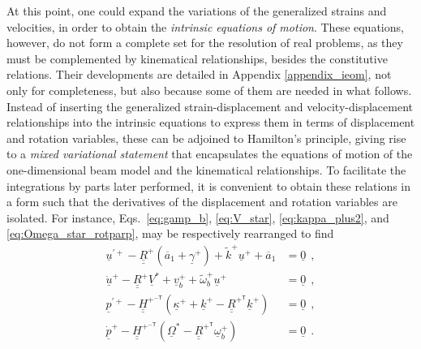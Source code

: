 \documentclass[12pt,a4paper,oneside,english]{abntex2} %
\newcommand{\vect}[1]{\underline{#1}}
\newcommand{\uvec}[1]{\overline{#1}}
\def\tens#1{\underline{\underline{#1}}}
\def\til#1{\widetilde{#1}}
\def\lp{\left(}
\def\rp{\right)}
\def\T{\mathsf{T}}
\def\aone{\uvec{a}_1}
\def\R{\tens{R}}
\def\Rp{\R^+}
\def\RpT{\R^{+^\T}}
\def\u{\vect{u}}
\def\uplus{\u^{+}}
\def\updot{\dot{\u}^{+}}
\def\upprime{\u^{\prime+}}
\def\vb{\vect{v}_b}
\def\vbplus{\vb^{+}}
\def\om{\vect{\omega}_b}
\def\omp{\om^{+}}
\def\omtil{\til{\omega}_b}
\def\omtilp{\omtil^{+}}
\def\gam{\vect{\gamma}}
\def\gamp{\gam^{+}}
\def\kap{\vect{\kappa}}
\def\kapp{\kap^{+}}
\def\k{\vect{k}}
\def\kp{\k^{+}}
\def\ktil{\til{k}}
\def\ktilp{\ktil^{+}}
\def\V{\vect{V}}
\def\Vs{\V^{*}}
\def\Om{\vect{\Omega}}
\def\Oms{\Om^{*}}
\def\H{\tens{H}}
\def\HpmT{\H^{+^{-\T}}}
\def\p{\vect{p}}
\def\pdot{\dot{\p}}
\def\ppdot{\pdot^{+}}
\def\ppprime{\p^{\prime{+}}}
\def\zv{\vect{0}}
\begin{document}
At this point, one could expand the variations of the generalized strains and velocities, in order to obtain the \textit{intrinsic equations of motion}.  These equations, however, do not form a complete set for the resolution of real problems, as they must be complemented by kinematical relationships, besides the constitutive relations. Their developments are detailed in Appendix \ref{appendix_ieom}, not only for completeness, but also because some of them are needed in what follows. Instead of inserting the generalized strain-displacement and velocity-displacement relationships into the intrinsic equations to express them in terms of displacement and rotation variables, these can be adjoined to Hamilton's principle, giving rise to a \textit{mixed variational statement} that encapsulates the equations of motion of the one-dimensional beam model and the kinematical relationships. To facilitate the integrations by parts later performed, it is convenient to obtain these relations in a form such that the derivatives of the displacement and rotation variables are isolated. For instance, Eqs.~\eqref{eq:gamp_b}, \eqref{eq:V_star}, \eqref{eq:kappa_plus2}, and \eqref{eq:Omega_star_rotparp}, may be respectively rearranged to find
\begin{equation}
\begin{aligned}
    \upprime-\Rp\lp\aone+\gamp\rp+\ktilp\uplus+\aone &= \zv \ \ ,
    \\
    \updot-\Rp\Vs+\vbplus+\omtilp\uplus &= \zv \ \ ,
    \\
    \ppprime-\HpmT\lp\kapp+\kp-\RpT\kp\rp &= \zv \ \ ,
    \\
    \ppdot-\HpmT\lp\Oms-\RpT\omp\rp &= \zv \ \ .
    \label{eq:kin_constraints} 
\end{aligned}
\end{equation}
\end{document}
